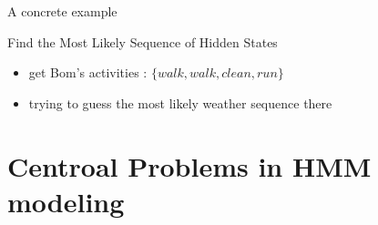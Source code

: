 \documentclass{beamer}
\begin{document}
\begin{frame}{A concrete example}
    \begin{block}{Find the Most Likely Sequence of Hidden States}
    \begin{itemize}
    \item get Bom's activities : $\{ walk, walk, clean, run  \}$
    \item trying to guess the most likely weather sequence there
    \end{itemize}

    \end{block}
\end{frame}

\section{Centroal Problems in HMM modeling}
\end{document}
